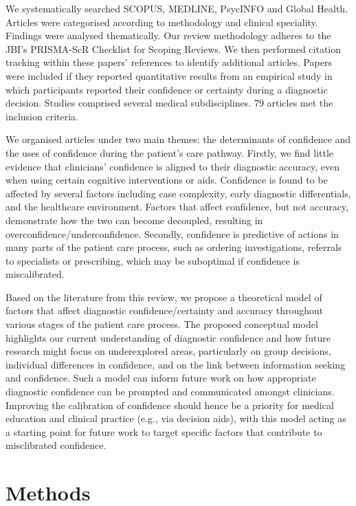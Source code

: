 \documentclass[a4paper, nobind]{templates/ociamthesis}
\begin{document}
\hfill\break
We systematically searched SCOPUS, MEDLINE, PsycINFO and Global Health. Articles were categorised according to methodology and clinical speciality. Findings were analysed thematically. Our review methodology adheres to the JBI's PRISMA-ScR Checklist for Scoping Reviews. We then performed citation tracking within these papers' references to identify additional articles. Papers were included if they reported quantitative results from an empirical study in which participants reported their confidence or certainty during a diagnostic decision. Studies comprised several medical subdisciplines. 79 articles met the inclusion criteria.

\hfill\break
We organised articles under two main themes: the determinants of confidence and the uses of confidence during the patient's care pathway. Firstly, we find little evidence that clinicians' confidence is aligned to their diagnostic accuracy, even when using certain cognitive interventions or aids. Confidence is found to be affected by several factors including case complexity, early diagnostic differentials, and the healthcare environment. Factors that affect confidence, but not accuracy, demonstrate how the two can become decoupled, resulting in overconfidence/underconfidence. Secondly, confidence is predictive of actions in many parts of the patient care process, such as ordering investigations, referrals to specialists or prescribing, which may be suboptimal if confidence is miscalibrated.

\hfill\break
Based on the literature from this review, we propose a theoretical model of factors that affect diagnostic confidence/certainty and accuracy throughout various stages of the patient care process. The proposed conceptual model highlights our current understanding of diagnostic confidence and how future research might focus on underexplored areas, particularly on group decisions, individual differences in confidence, and on the link between information seeking and confidence. Such a model can inform future work on how appropriate diagnostic confidence can be prompted and communicated amongst clinicians. Improving the calibration of confidence should hence be a priority for medical education and clinical practice (e.g., via decision aids), with this model acting as a starting point for future work to target specific factors that contribute to misclibrated confidence.

\section*{Methods}\label{methods}
\end{document}
